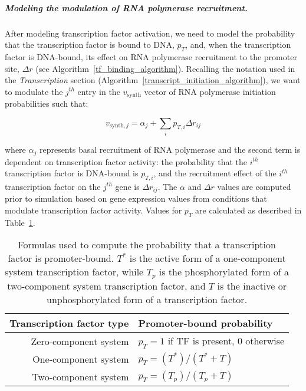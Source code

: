 \documentclass[12pt]{article}
\begin{document}
\subparagraph{Modeling the modulation of RNA polymerase recruitment.}
After modeling transcription factor activation, we need to model the probability that the transcription factor is bound to DNA, \(p_T\), and, when the transcription factor is DNA-bound, its effect on RNA polymerase recruitment to the promoter site, \(\Delta r\) (see Algorithm~\ref{tf_binding_algorithm}).  Recalling the notation used in the \textit{Transcription} section (Algorithm~\ref{transcript_initiation_algorithm}), we want to modulate the \(j^{th}\) entry in the \(v_\text{synth}\) vector of RNA polymerase initiation probabilities such that:

\begin{equation}
v_{\text{synth}, j} = \alpha_j + \sum_{i} p_{T, i} \Delta r_{i j}
\end{equation}

\noindent where \(\alpha_j\) represents basal recruitment of RNA polymerase and the second term is dependent on transcription factor activity: the probability that the \(i^{th}\) transcription factor is DNA-bound is \(p_{T, i}\), and the recruitment effect of the \(i^{th}\) transcription factor on the \(j^{th}\) gene is \(\Delta r_{i j}\). The \(\alpha\) and \(\Delta r\) values are computed prior to simulation based on gene expression values from conditions that modulate transcription factor activity.  Values for \(p_T\) are calculated as described in Table~\ref{table:transcription_pt}.


\begin{table}[!hbt]
\centering
\begin{tabular}{r l}
Transcription factor type & Promoter-bound probability \\
\hline
Zero-component system & \(p_T = 1\) if TF is present, \(0\) otherwise \\
One-component system & \(p_T = (T^*) / (T^* + T)\) \\
Two-component system & \(p_T = (T_p) / (T_p + T)\) \\
\end{tabular}
\caption[Formulas used to compute the probability that a transcription factor is promoter-bound.]{Formulas used to compute the probability that a transcription factor is promoter-bound. \(T^*\) is the active form of a one-component system transcription factor, while \(T_p\) is the phosphorylated form of a two-component system transcription factor, and \(T\) is the inactive or unphosphorylated form of a transcription factor.}
\label{table:transcription_pt}
\end{table}
\end{document}
